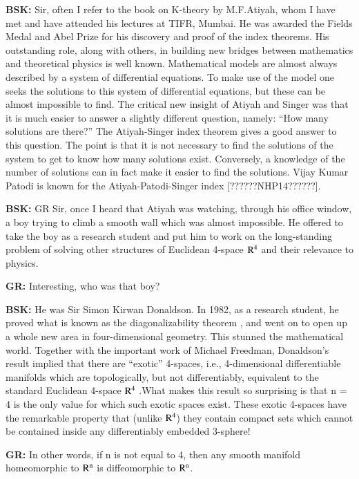 \textbf{BSK:} Sir, often I refer to the book on K-theory by M.F.Atiyah, whom I have met  and have attended his lectures at TIFR, Mumbai. He was awarded the Fields Medal and Abel Prize for his discovery and proof of the index theorems. His outstanding role, along with others, in building new bridges between mathematics and theoretical physics is well known. Mathematical models are almost always described by a system of differential equations. To make use of the model one seeks the solutions to this system of differential equations, but these can be almost impossible to find. The critical new insight of Atiyah and Singer was that it is much easier to answer a slightly different question, namely: “How many solutions are there?” The Atiyah-Singer index theorem gives a good answer to this question. The point is that it is not necessary to find the solutions of the system to get to know how many solutions exist. Conversely, a knowledge of the number of solutions can in fact make it easier to find the solutions. Vijay Kumar Patodi is known for the Atiyah-Patodi-Singer index [??????NHP14??????].

\textbf{BSK:} GR Sir, once I heard that Atiyah was watching, through his office window, a boy trying to climb a smooth wall which was almost impossible. He offered to take the boy as a research student and put him to work on the long-standing problem of solving other structures of Euclidean 4-space ${\rm R}^{4}$ and their relevance to physics.

\textbf{GR:} Interesting, who was that boy?

\textbf{BSK:} He was Sir Simon Kirwan Donaldson. In 1982, as a research student, he proved what is known as the diagonalizability theorem \cite{chap13-key08SD}, and went on to open up a whole new area in four-dimensional geometry. This stunned the mathematical world. Together with the important work of Michael Freedman, Donaldson's result implied that there are “exotic” 4-spaces, i.e., 4-dimensional differentiable manifolds which are topologically, but not differentiably, equivalent to the standard Euclidean 4-space  ${\rm R}^{4}$ .What makes this result so surprising is that n = 4 is the only value for which such exotic spaces exist. These exotic 4-spaces have the remarkable property that (unlike ${\rm R}^{4}$) they contain compact sets which cannot be contained inside any differentiably embedded 3-sphere!

\textbf{GR:} In other words, if n is not equal to 4, then any smooth manifold homeomorphic to ${\rm R}^{\rm n}$ is diffeomorphic to ${\rm R}^{\rm n}$.

